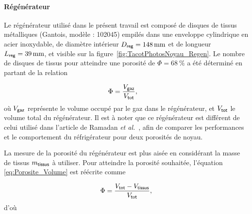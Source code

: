 
\paragraph{Régénérateur} \label{chap:DispExpe_Regen}
Le régénérateur utilisé dans le présent travail est composé de disques de tissus métalliques (Gantois, modèle : 102045) empilés dans une enveloppe cylindrique en acier inoxydable, de diamètre intérieur $D_{\sf reg}=\qty{148}{\mm}$ et de longueur $L_{\sf reg}=\qty{39}{\mm}$, et visible sur la figure~\ref{fig:TacotPhotosNoyau_Regen}. Le nombre de disques de tissus pour atteindre une porosité de $\Phi=\qty{68}{\percent}$ a été déterminé en partant de la relation

\begin{align}
	\Phi &= \frac{V_{\sf gaz}}{V_{\sf tot}}, \label{eq:Porosite_Volume}%
\end{align}
où $V_{\sf gaz}$ représente le volume occupé par le gaz dans le régénérateur, et $V_{\sf tot}$ le volume total du régénérateur. Il est à noter que ce régénérateur est différent de celui utilisé dans l'article de Ramadan \textit{et al.}~\cite{ramadan_design_2021}, afin de comparer les performances et le comportement du réfrigérateur pour deux porosités de noyau. 

La mesure de la porosité du régénérateur est plus aisée en considérant la masse de tissus $m_{\sf tissus}$ à utiliser. Pour atteindre la porosité souhaitée, l'équation \eqref{eq:Porosite_Volume} est réécrite comme

\begin{equation*}
	\Phi = \frac{V_{\sf tot} - V_{\sf tissus}}{V_{\sf tot}},
\end{equation*}
d'où

